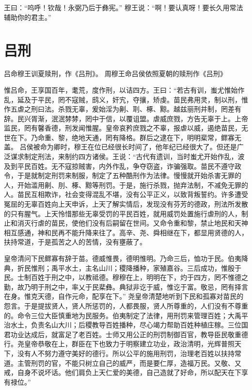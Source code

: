 \documentclass[12pt,UTF8]{ctexbook}
\begin{document}
王曰：“呜呼！钦哉！永弼乃后于彝宪。”
穆王说：“啊！要认真呀！要长久用常法辅助你的君主。”

\chapter{吕刑}

吕命穆王训夏赎刑，作《吕刑》。
周穆王命吕侯依照夏朝的赎刑作《吕刑》

惟吕命，王享国百年，耄荒，度作刑，以诘四方。王曰：“若古有训，蚩尤惟始作乱，延及于平民，罔不寇贼，鸱义，奸宄，夺攘，矫虔。苗民弗用灵，制以刑，惟作五虐之刑曰法。杀戮无辜，爰始淫为劓、刵、椓、黥。越兹丽刑并制，罔差有辞。民兴胥渐，泯泯棼棼，罔中于信，以覆诅盟。虐威庶戮，方告无辜于上。上帝监民，罔有馨香德，刑发闻惟腥。皇帝哀矜庶戮之不辜，报虐以威，遏绝苗民，无世在下。乃命重、黎，绝地天通，罔有降格。群后之逮在下，明明棐常，鳏寡无盖。
吕侯被命为卿时，穆王在位已经很长时间了，他年纪已经很大了。但还是广泛谋求制定刑法，来制约四方诸侯。王说：“古代有遗训，当时蚩尤开始作乱，波及到平民百姓。无不寇掠贼害，内外作乱，争夺窃盗，诈骗强取。苗民不遵守政令，于是就制定刑罚来制服，制定了五种酷刑作为法律。慢慢就开始杀害无罪的人，开始滥用劓、刖、椓、黥等刑罚。于是，施行杀戮，抛弃法制，不减免无罪的人。苗民互相欺诈，社会变得混乱不堪，没有公平正义，以致背叛誓约。许多遭受冤屈的无辜百姓向上天申诉，上天了解实情后，发现没有芬芳的德政，刑法所发散的只有腥气。上天怜惜那些无辜受罚的平民百姓，就用威罚处置施行虐刑的人，制止和消灭行虐的苗民，使他们没有后嗣留在世间。又命令重和黎，禁止地民和天神相互感通，神和民再不能升降来往了。高辛、尧、舜相继在下，都显用贤德的人，扶持常道，于是孤苦之人的苦情，没有壅蔽了。

皇帝清问下民鳏寡有辞于苗。德威惟畏，德明惟明。乃命三后，恤功于民。伯夷降典，折民惟刑；禹平水土，主名山川；稷降播种，家殖嘉谷。三后成功，惟殷于民。士制百姓于刑之中，以教祗德。穆穆在上，明明在下，灼于四方，罔不惟德之勤，故乃明于刑之中，率乂于民棐彝。典狱非讫于威，惟讫于富。敬忌，罔有择言在身。惟克天德，自作元命，配享在下。”
尧皇帝清楚地听到下民和孤寡对苗民的怨言。于是提拔贤人，贤人所惩罚的，人都畏服，贤人所尊重的，人们没有不尊重的。命令三位大臣慎重地为民服务。伯夷制定了法律，用刑罚来管理百姓；大禹平治水土，负责名山大川；后稷教导百姓播种，尽心竭力帮助百姓种植庄稼。三位国君功业达成后，就富足了老百姓。士师又用公正的刑罚制御百官，教导臣民敬重德行。尧皇帝恭敬在上，群臣在下也致力于明察建立功业，政治清明，光辉普照天下，没有人不努力遵守美好的德行。所以公平的施用刑罚，治理老百姓以扶持常道。主管刑罚的官，不能只树立自己的威严，而是要仁厚，造福万民。又敬、又戒，自身不说坏话。他们肩负上天仁爱的美德，自己造就了好命，所以配天在下享有禄位。”
\end{document}
